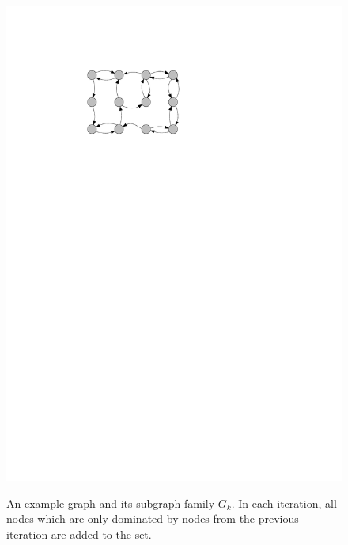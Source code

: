 \begin{figure}
{\includegraphics{figures/G_4.pdf}}
\caption{An example graph and its subgraph family $G_k$. In each iteration, all nodes which are only dominated by nodes from the previous iteration are added to the set.}
\label{graphs}

\end{figure}



